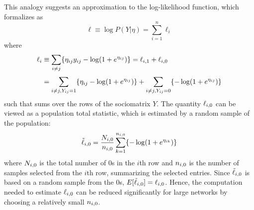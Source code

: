     This analogy suggests an approximation to the log-likelihood function, which \citeauthor*{raftery2012fast} formalizes as
    \begin{equation}
    \label{eq:case-likelihood-approx}
        \ell \equiv \log P(Y|\eta)=\sum_{i=1}^n \ell_i
    \end{equation}
    where
    \begin{equation}
        \setlength{\jot}{0.5\baselineskip}
        \begin{split}
            \ell_i &\equiv \sum_{i\neq j}\{\sub(\eta)\sub(y)-\log(1+e^{\sub(\eta)})\} = \sub(\ell)(i,1) + \sub(\ell)(i,0)\\
            &= \sum_{i\neq j, \sub(Y)=1} \{\sub(\eta)-\log(1+e^{\sub(\eta)}) \} + \sum_{i\neq j, \sub(Y)=0} \{-\log(1+e^{\sub(\eta)}) \} \\
        \end{split}
    \end{equation}
    such that  sums over the rows of the sociomatrix $Y$. The quantity $\sub(\ell)(i,0)$ can be viewed as a population total statistic, which is estimated by a random sample of the population:
    \begin{equation}
        \sub(\tilde{\ell})(i,0)=\frac{\sub(N)(i,0)}{\sub(n)(i,0)} \sum_{k=1}^{\sub(n)(i,0)} \{ -\log(1+e^{\sub(\eta)(ik)}) \}
    \end{equation}
    where $\sub(N)(i,0)$ is the total number of 0s in the $i$th row and $\sub(n)(i,0)$ is the number of samples selected from the $i$th row, summarizing the selected entries. Since $\sub(\tilde{\ell})(i,0)$ is based on a random sample from the 0s, $E[\sub(\tilde{\ell})(i,0)] = \sub(\ell)(i,0)$. Hence, the computation needed to estimate $\sub(\ell)(i,0)$ can be reduced significantly for large networks by choosing a relatively small $\sub(n)(i,0)$.
    
